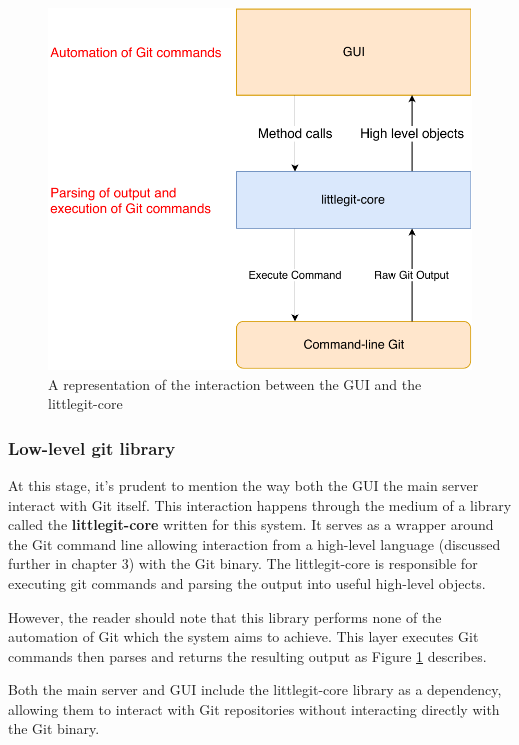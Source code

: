\begin{figure} 
    \centering
    \includegraphics[scale = 0.5]{figures/gui-core.pdf}
    \caption{A representation of the interaction between the GUI and the littlegit-core }
    \label{fig:gui-layers}
\end{figure}
\subsubsection{ Low-level git library}

At this stage, it's prudent to mention the way both the GUI the main server interact with Git itself. This interaction happens through the medium of a library called the \textbf{littlegit-core} written for this system. It serves as a wrapper around the Git command line allowing interaction from a high-level language (discussed further in chapter 3) with the Git binary. The littlegit-core is responsible for executing git commands and parsing the output into useful high-level objects.

However, the reader should note that this library performs none of the automation of Git which the system aims to achieve. This layer executes Git commands then parses and returns the resulting output as Figure \ref{fig:gui-layers} describes.

Both the main server and GUI include the littlegit-core library as a dependency, allowing them to interact with Git repositories without interacting directly with the Git binary.

